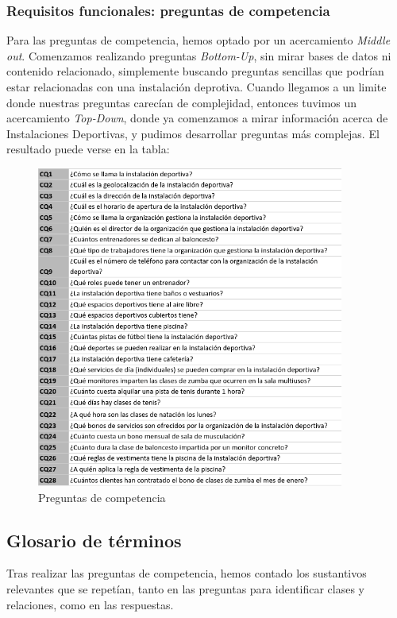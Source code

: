 \documentclass[a4paper,12pt]{article}
\begin{document}
	\subsubsection{Requisitos funcionales:  preguntas de competencia}
	Para las preguntas de competencia, hemos optado por un acercamiento \textit{Middle out}. Comenzamos realizando preguntas \textit{Bottom-Up}, sin mirar bases de datos ni contenido relacionado, simplemente buscando preguntas sencillas que podrían estar relacionadas con una instalación deprotiva. Cuando llegamos a un limite donde nuestras preguntas carecían de complejidad, entonces tuvimos un acercamiento \textit{Top-Down}, donde ya comenzamos a mirar información acerca de Instalaciones Deportivas, y pudimos desarrollar preguntas más complejas. El resultado puede verse en la tabla:
	\begin{figure}[H]
		\centering
		\includegraphics[width=0.9\textwidth]{include/preguntas_competencia.png}
		\caption{Preguntas de competencia}
	\end{figure}
	
	\subsection{Glosario de términos}
	
	Tras realizar las preguntas de competencia, hemos contado los sustantivos relevantes que se repetían, tanto en las preguntas para identificar clases y relaciones, como en las respuestas. 
	
\end{document}

